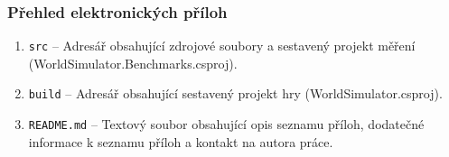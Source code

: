 \label{chap:attachments}

\subsubsection{Přehled elektronických příloh}

\begin{enumerate}
    \item \texttt{src} -- Adresář obsahující zdrojové soubory a sestavený projekt měření (WorldSimulator.Benchmarks.csproj).

    \item \texttt{build} -- Adresář obsahující sestavený projekt hry (WorldSimulator.csproj).

    \item \texttt{README.md} -- Textový soubor obsahující opis seznamu příloh, dodatečné informace k seznamu příloh a kontakt na autora práce.
\end{enumerate}